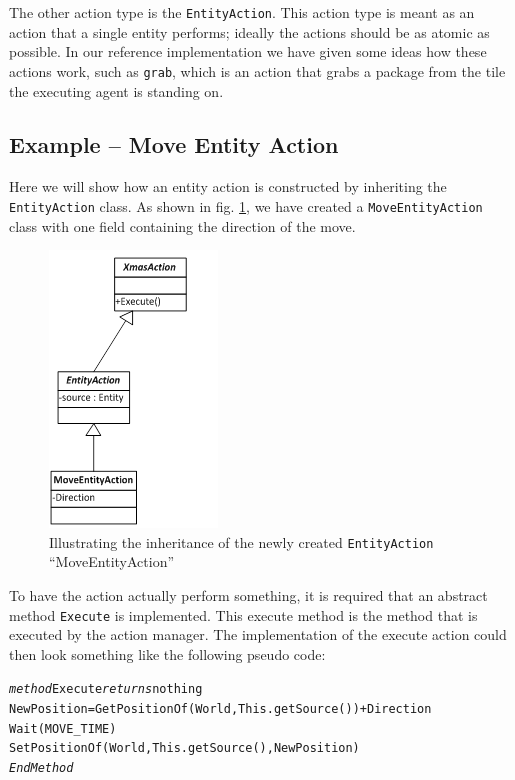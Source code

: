 The other action type is the \texttt{EntityAction}. This action type
is meant as an action that a single entity performs; ideally the actions
should be as atomic as possible. In our reference implementation we
have given some ideas how these actions work, such as \texttt{grab},
which is an action that grabs a package from the tile the executing
agent is standing on.


\subsection{Example -- Move Entity Action}

Here we will show how an entity action is constructed by inheriting
the \texttt{EntityAction} class. As shown in fig. \ref{fig:MoveEntityActionExample},
we have created a \texttt{MoveEntityAction} class with one field containing
the direction of the move.

\begin{figure}
\begin{centering}
\includegraphics{MoveEntityActionExample}
\par\end{centering}

\caption{\label{fig:MoveEntityActionExample} Illustrating the inheritance
of the newly created \texttt{EntityAction} ``MoveEntityAction''}
\end{figure}


To have the action actually perform something, it is required that
an abstract method \texttt{Execute} is implemented. This execute method
is the method that is executed by the action manager. The implementation
of the execute action could then look something like the following
pseudo code:

\begin{alltt}
\textit{method} Execute \textit{returns} nothing 
    NewPosition = GetPositionOf(World, This.getSource()) + Direction 
    Wait(MOVE_TIME) 
    SetPositionOf(World,This.getSource(), NewPosition) 
\textit{EndMethod}
\end{alltt}

